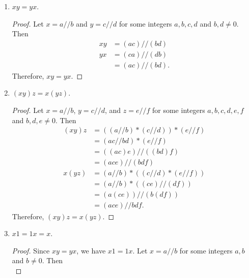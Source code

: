 \documentclass[12pt, letter]{article}
\begin{document}
\begin{enumerate}
\begin{proof}
\begin{equation*}
\begin{aligned}
                x+(-x)&=a//b-(a//b)\\
                &=a//b+(-a)//b\\
                &=(ab+(-a)b)//b^2\\
                &=0.
            \end{aligned}
        \end{equation*}
        Therefore, $x+(-x)=(-x)+x=0$.
    \end{proof}
    \item $xy=yx$.
    \begin{proof}
        Let $x=a//b$ and $y=c//d$ for some integers $a,b,c,d$ and $b,d\ne 0$. Then 
        \begin{equation*}
            \begin{aligned}
                xy&=(ac)//(bd)\\
                yx&=(ca)//(db)\\
                &=(ac)//(bd).
            \end{aligned}
        \end{equation*}
        Therefore, $xy=yx$.
    \end{proof}
    \item $(xy)z=x(yz)$. 
    \begin{proof}
        Let $x=a//b$, $y=c//d$, and $z=e//f$ for some integers $a,b,c,d,e,f$ and $b,d,e\ne 0$. Then 
        \begin{equation*}
            \begin{aligned}
                (xy)z&=((a//b)*(c//d))*(e//f)\\
                &=(ac//bd)*(e//f)\\
                &=((ac)e)//((bd)f)\\
                &=(ace)//(bdf)\\
                x(yz)&=(a//b)*((c//d)*(e//f))\\
                &=(a//b)*((ce)//(df))\\
                &=(a(ce))//(b(df))\\
                &=(ace)//bdf.
            \end{aligned}
        \end{equation*}
        Therefore, $(xy)z=x(yz)$.
    \end{proof}
    \item $x1=1x=x$.
    \begin{proof}
        Since $xy=yx$, we have $x1=1x$. Let $x=a//b$ for some integers $a,b$ and $b\ne 0$. Then 
        \begin{equation*}

\end{equation*}
\end{proof}
\end{enumerate}
\end{document}
